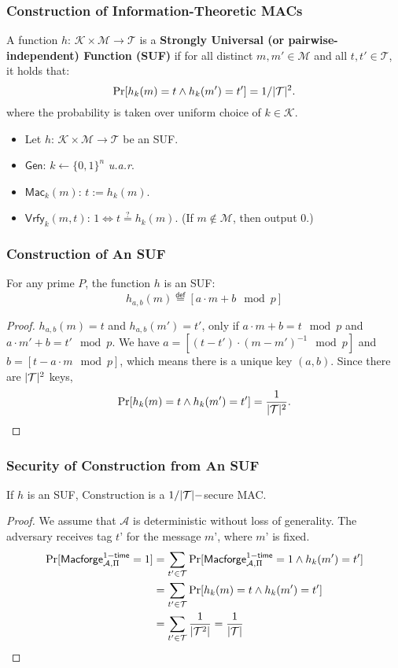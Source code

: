 \begin{frame}\frametitle{Construction of Information-Theoretic MACs}
\begin{definition}
A function $h$: $\mathcal{K} \times \mathcal{M} \to \mathcal{T}$ is a \textbf{Strongly Universal (or pairwise-independent) Function (SUF)} if for all distinct $m, m' \in \mathcal{M}$ and all $t, t' \in \mathcal{T}$, it holds that:
\[ \Pr [h_k(m) = t  \land h_k(m') = t'] = 1 / \lvert\mathcal{T}\rvert^2.
\]
where the probability is taken over uniform choice of $k \in \mathcal{K}$.
\end{definition}
\begin{construction}
\begin{itemize}
\item Let $h$: $\mathcal{K} \times \mathcal{M} \to \mathcal{T}$ be an SUF.
\item $\mathsf{Gen}$: $k \gets \{0,1\}^n$ \emph{u.a.r}.
\item $\mathsf{Mac}_k(m)$: $t := h_k(m)$.
\item $\mathsf{Vrfy}_k(m,t)$: $1 \iff t \overset{?}{=} h_k(m)$. (If $m \notin \mathcal{M}$, then output 0.)
\end{itemize}
\end{construction}
\end{frame}
\begin{frame}\frametitle{Construction of An SUF}
\begin{theorem}
For any prime $P$, the function $h$ is an SUF:
\[ h_{a,b}(m) \overset{\mathsf{def}}{=} [ a \cdot m + b \mod p]
\]
\end{theorem}
\begin{proof}
$h_{a,b}(m) = t$ and $h_{a,b}(m') = t'$, only if 
$a \cdot m + b  = t \mod p$  and  $a \cdot m' + b = t' \mod p$. We have $a = [(t-t') \cdot (m - m')^{-1} \mod p]$ and $b = [t - a \cdot m \mod p]$, which means there is a unique key $(a, b)$. Since there are $\lvert\mathcal{T}\rvert^2$ keys, 
\[ \Pr [h_k(m) = t  \land h_k(m') = t'] = \frac{1}{\lvert\mathcal{T}\rvert^2}.
\]
\end{proof}
\end{frame}
\begin{frame}\frametitle{Security of Construction from An SUF}
\begin{theorem}
If $h$ is an SUF, Construction is a $1/\lvert\mathcal{T}\rvert-$secure MAC.
\end{theorem}
\begin{proof}
We assume that $\mathcal{A}$ is deterministic without loss of generality. The adversary receives tag $t’$ for the message $m’$, where $m’$ is fixed.
\[
\begin{split}
\Pr [\mathsf{Macforge}_{\mathcal{A},\Pi}^{1-\mathsf{time}} = 1] &=  \sum_{t' \in \mathcal{T}} \Pr [\mathsf{Macforge}_{\mathcal{A},\Pi}^{1-\mathsf{time}} = 1 \land h_k(m')=t'] \\
&= \sum_{t' \in \mathcal{T}} \Pr [h_k(m)=t \land h_k(m')=t'] \\
&= \sum_{t' \in \mathcal{T}} \frac{1}{\lvert\mathcal{T}^2\rvert} =  \frac{1}{\lvert\mathcal{T}\rvert}
\end{split}
\]
\end{proof}
\end{frame}
